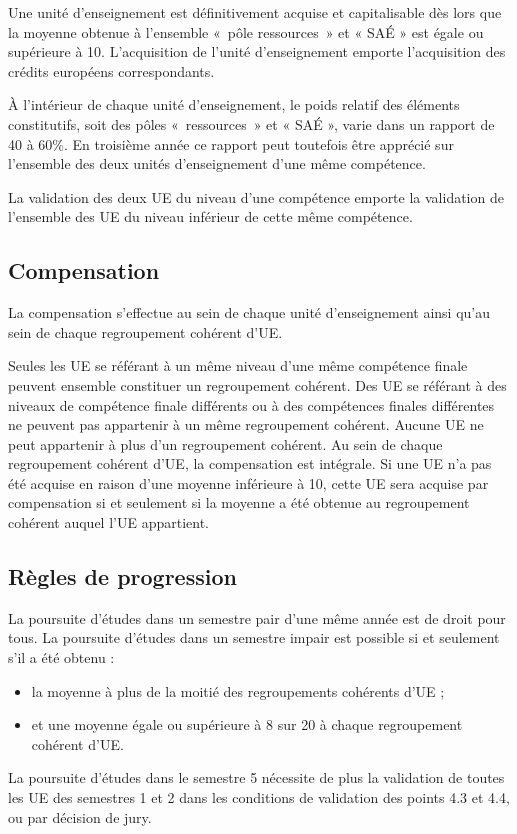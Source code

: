 \documentclass[10pt]{article}
\begin{document}
Une unité d'enseignement est définitivement acquise et capitalisable dès
lors que la moyenne obtenue à l'ensemble «~pôle ressources~» et « SAÉ »
est égale ou supérieure à 10. L'acquisition de l'unité d'enseignement
emporte l'acquisition des crédits européens correspondants.

À l'intérieur de chaque unité d'enseignement, le poids relatif des
éléments constitutifs, soit des pôles «~ressources~» et « SAÉ », varie
dans un rapport de 40 à 60\%. En troisième année ce rapport peut
toutefois être apprécié sur l'ensemble des deux unités d'enseignement
d'une même compétence.

La validation des deux UE du niveau d'une compétence emporte la
validation de l'ensemble des UE du niveau inférieur de cette même
compétence.

\subsection{Compensation}
La compensation s'effectue au sein de chaque unité d'enseignement ainsi
qu'au sein de chaque regroupement cohérent d'UE.

Seules les UE se référant à un même niveau d'une même compétence finale
peuvent ensemble constituer un regroupement cohérent. Des UE se référant
à des niveaux de compétence finale différents ou à des compétences
finales différentes ne peuvent pas appartenir à un même regroupement
cohérent. Aucune UE ne peut appartenir à plus d'un regroupement
cohérent.  Au sein de chaque regroupement cohérent d'UE, la compensation
est intégrale. Si une UE n'a pas été acquise en raison d'une moyenne
inférieure à 10, cette UE sera acquise par compensation si et seulement
si la moyenne a été obtenue au regroupement cohérent auquel l'UE
appartient.

\subsection{Règles de progression}
La poursuite d'études dans un semestre pair d'une même année est de
droit pour tous. La poursuite d'études dans un semestre impair
est possible si et seulement s'il a été obtenu :
\begin{itemize}
\item la moyenne à plus de la moitié des regroupements cohérents d'UE ;
\item et une moyenne égale ou supérieure à 8 sur 20 à chaque
  regroupement cohérent d'UE.
\end{itemize}
La poursuite d'études dans le semestre 5 nécessite de plus la validation
de toutes les UE des semestres 1 et 2 dans les conditions de validation
des points 4.3 et 4.4, ou par décision de jury.
\end{document}
